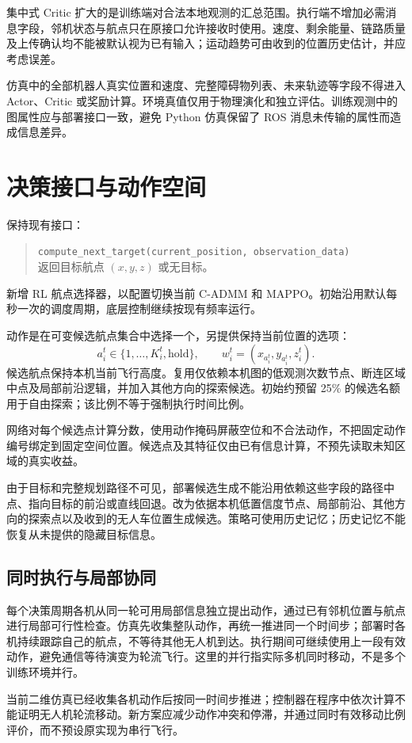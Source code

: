 \documentclass[UTF8,a4paper,11pt,fontset=fandol]{ctexart}
\begin{document}
集中式 Critic 扩大的是训练端对合法本地观测的汇总范围。执行端不增加必需消息字段，邻机状态与航点只在原接口允许接收时使用。速度、剩余能量、链路质量及上传确认均不能被默认视为已有输入；运动趋势可由收到的位置历史估计，并应考虑误差。

仿真中的全部机器人真实位置和速度、完整障碍物列表、未来轨迹等字段不得进入 Actor、Critic 或奖励计算。环境真值仅用于物理演化和独立评估。训练观测中的图属性应与部署接口一致，避免 Python 仿真保留了 ROS 消息未传输的属性而造成信息差异。

\section{决策接口与动作空间}
保持现有接口：
\begin{quote}
\texttt{compute\_next\_target(current\_position, observation\_data)}\\
返回目标航点 $(x,y,z)$ 或无目标。
\end{quote}

新增 RL 航点选择器，以配置切换当前 C-ADMM 和 MAPPO。初始沿用默认每秒一次的调度周期，底层控制继续按现有频率运行。

动作是在可变候选航点集合中选择一个，另提供保持当前位置的选项：
\[
 a_i^t\in\{1,\ldots,K_i^t,\mathrm{hold}\},\qquad
 w_i^t=(x_{a_i^t},y_{a_i^t},z_i^t).
\]
候选航点保持本机当前飞行高度。复用仅依赖本机图的低观测次数节点、断连区域中点及局部前沿逻辑，并加入其他方向的探索候选。初始约预留 25\% 的候选名额用于自由探索；该比例不等于强制执行时间比例。

网络对每个候选点计算分数，使用动作掩码屏蔽空位和不合法动作，不把固定动作编号绑定到固定空间位置。候选点及其特征仅由已有信息计算，不预先读取未知区域的真实收益。

由于目标和完整规划路径不可见，部署候选生成不能沿用依赖这些字段的路径中点、指向目标的前沿或直线回退。改为依据本机低置信度节点、局部前沿、其他方向的探索点以及收到的无人车位置生成候选。策略可使用历史记忆；历史记忆不能恢复从未提供的隐藏目标信息。

\subsection{同时执行与局部协同}
每个决策周期各机从同一轮可用局部信息独立提出动作，通过已有邻机位置与航点进行局部可行性检查。仿真先收集整队动作，再统一推进同一个时间步；部署时各机持续跟踪自己的航点，不等待其他无人机到达。执行期间可继续使用上一段有效动作，避免通信等待演变为轮流飞行。这里的并行指实际多机同时移动，不是多个训练环境并行。

当前二维仿真已经收集各机动作后按同一时间步推进；控制器在程序中依次计算不能证明无人机轮流移动。新方案应减少动作冲突和停滞，并通过同时有效移动比例评价，而不预设原实现为串行飞行。
\end{document}
